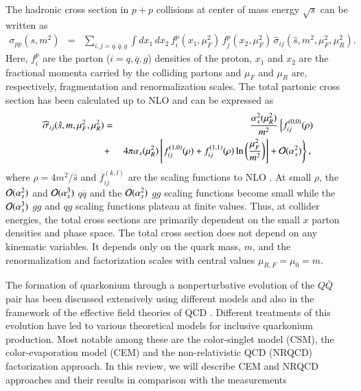 The hadronic cross section in $p+p$ collisions at center of mass energy
$\sqrt{s}$ can be written as
\begin{eqnarray}
\sigma_{pp}(s,m^2) & = & \sum_{i,j = q, \overline q, g} 
\int dx_1 \, dx_2 \, 
f_i^p (x_1,\mu_F^2) \,
f_j^p(x_2,\mu_F^2) \, \widehat{\sigma}_{ij}(\hat{s},m^2,\mu_F^2,\mu_R^2).
\label{sigpp}
\end{eqnarray}
Here, $f_i^p$ are the parton (${i = q, \overline q, g}$) densities of the proton,
$x_1$ and $x_2$ are the fractional momenta carried by the colliding
partons and $\mu_F$ and $\mu_R$ are, respectively, fragmentation and renormalization scales. 
The total partonic cross section has been calculated up to NLO
\cite{Nason:1989zy,Nason:1987xz} and can be expressed as
\begin{eqnarray}
\widehat{\sigma}_{ij}(\hat{s},m,\mu_F^2,\mu_R^2) & = & 
\frac{\alpha_s^2(\mu_R^2)}{m^2}
\left\{ f^{(0,0)}_{ij}(\rho) \right. \nonumber \\
 & + & \left. 4\pi \alpha_s(\mu_R^2) \left[f^{(1,0)}_{ij}(\rho) + 
f^{(1,1)}_{ij}(\rho)\ln\bigg(\frac{\mu_F^2}{m^2} \bigg) \right] 
+ {\cal O}(\alpha_s^2) \right\},
\,\, 
\label{sigpart}
\end{eqnarray}
where $\rho = 4m^2/\hat{s}$ and 
$f_{ij}^{(k,l)}$ are the scaling functions to NLO \cite{Nason:1989zy,Nason:1987xz}. 
At small $\rho$, the ${\cal O}(\alpha_s^2)$ and ${\cal O}(\alpha_s^3)$
$q \overline q$ and the ${\cal O}(\alpha_s^2)$ $gg$ scaling functions 
become small while the ${\cal O}(\alpha_s^3)$ $gg$ and $qg$ scaling functions
plateau at finite values.  Thus, at collider energies, the total cross sections
are primarily dependent on the small $x$ parton densities and phase space.
The total cross section does not depend on any kinematic variables. It depends  
only on the quark mass, $m$, and the renormalization and factorization scales with central
values $\mu_{R,F} =\mu_0 = m$.


The formation of quarkonium through a nonperturbative evolution of the $Q\bar Q$ pair 
has been discussed extensively using different models and also in the framework of the 
  effective field theories of QCD
\cite{Bodwin:1994jh,Brambilla:2004wf}. Different
treatments of this evolution have led to various theoretical models for
inclusive quarkonium production. Most notable among these are the color-singlet
model (CSM), the color-evaporation model (CEM) and the non-relativistic QCD
(NRQCD) factorization approach. In this review, we will describe CEM and NRQCD 
approaches and their results in comparison with the measurements 

